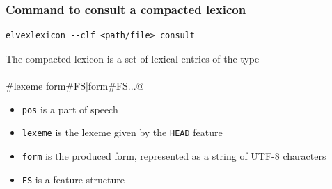 \documentclass[11pt]{article}
\begin{document}
\subsubsection*{Command to consult a compacted lexicon}

\begin{lstlisting}[frame=none, numbers=none]
elvexlexicon --clf <path/file> consult
\end{lstlisting}

The compacted lexicon is a set of lexical entries of the type

\paragraph{}\verb@pos#lexeme	form#FS|form#FS...@

\begin{itemize}
	\item \verb#pos# is a part of speech
	\item \verb#lexeme# is the lexeme given by the \verb#HEAD# feature
	\item \verb#form# is the produced form, represented as a string of UTF-8 characters
	\item \verb#FS# is a feature structure
\end{itemize}
\end{document}
